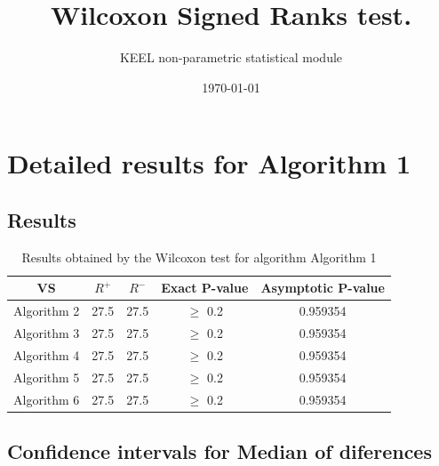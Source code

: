 \documentclass[a4paper,10pt]{article}
\title{Wilcoxon Signed Ranks test.}
\date{\today}
\author{KEEL non-parametric statistical module}
\begin{document}
\pagestyle{empty}
\maketitle
\thispagestyle{empty}



\section{Detailed results for Algorithm 1}


\subsection{Results}

\begin{table}[!htp]
\centering\small
\begin{tabular}{
|c|c|c|c|c|}
\hline
 VS & $R^{+}$ & $R^{-}$ & Exact P-value & Asymptotic P-value \\ \hline 
Algorithm 2 & 27.5 & 27.5 & $\geq$ 0.2 & 0.959354\\ \hline 
Algorithm 3 & 27.5 & 27.5 & $\geq$ 0.2 & 0.959354\\ \hline 
Algorithm 4 & 27.5 & 27.5 & $\geq$ 0.2 & 0.959354\\ \hline 
Algorithm 5 & 27.5 & 27.5 & $\geq$ 0.2 & 0.959354\\ \hline 
Algorithm 6 & 27.5 & 27.5 & $\geq$ 0.2 & 0.959354\\ \hline 

\end{tabular}
\caption{Results obtained by the Wilcoxon test for algorithm Algorithm 1}
\end{table}

\subsection{Confidence intervals for Median of diferences}
\end{document}
